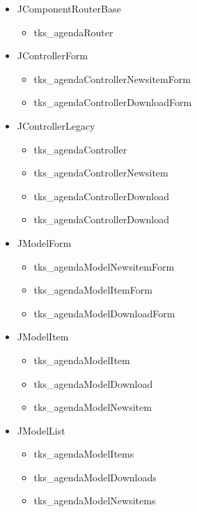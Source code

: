 \documentclass{article}
\begin{document}
\begin{itemize}
\item JComponentRouterBase
\begin{itemize}
	\item tks\_agendaRouter
\end{itemize}
\item JControllerForm
\begin{itemize}
	\item tks\_agendaControllerNewsitemForm
	\item tks\_agendaControllerDownloadForm
\end{itemize}
\item JControllerLegacy
\begin{itemize}
	\item tks\_agendaController 
	\item tks\_agendaControllerNewsitem 
	\item tks\_agendaControllerDownload 
	\item tks\_agendaControllerDownload 
\end{itemize}
\item JModelForm
\begin{itemize}
	\item tks\_agendaModelNewsitemForm
	\item tks\_agendaModelItemForm  
	\item tks\_agendaModelDownloadForm
\end{itemize}
\item JModelItem
\begin{itemize}
	\item tks\_agendaModelItem
	\item tks\_agendaModelDownload
	\item tks\_agendaModelNewsitem
\end{itemize}
\item JModelList
\begin{itemize}
	\item tks\_agendaModelItems
	\item tks\_agendaModelDownloads
	\item tks\_agendaModelNewsitems
\end{itemize}
\end{itemize}
\newpage
\end{document}
